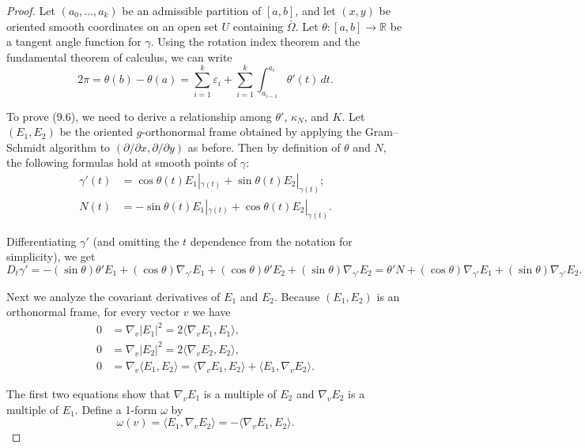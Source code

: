 \begin{proof}
Let $(a_0, \ldots, a_k)$ be an admissible partition of $[a,b]$, and let $(x, y)$ be oriented
smooth coordinates on an open set $U$ containing $\bar{\Omega}$. Let $\theta : [a, b] \to \mathbb{R}$ be a tangent
angle function for $\gamma$. Using the rotation index theorem and the fundamental theorem
of calculus, we can write
\begin{equation}
2\pi = \theta(b) - \theta(a) = \sum_{i=1}^k \varepsilon_i + \sum_{i=1}^k \int_{a_{i-1}}^{a_i} \theta'(t)\,dt. \tag{9.7}
\end{equation}

To prove (9.6), we need to derive a relationship among $\theta'$, $\kappa_N$, and $K$.
Let $(E_1, E_2)$ be the oriented $g$-orthonormal frame obtained by applying the
Gram--Schmidt algorithm to $(\partial/\partial x, \partial/\partial y)$ as before. Then by definition of $\theta$ and
$N$, the following formulas hold at smooth points of $\gamma$:
\begin{align*}
\gamma'(t) &= \cos\theta(t) E_1|_{\gamma(t)} + \sin\theta(t) E_2|_{\gamma(t)};\\
N(t) &= -\sin\theta(t) E_1|_{\gamma(t)} + \cos\theta(t) E_2|_{\gamma(t)}.
\end{align*}

Differentiating $\gamma'$ (and omitting the $t$ dependence from the notation for simplicity),
we get
\begin{equation}
D_t\gamma' = -(\sin\theta)\theta' E_1 + (\cos\theta)\nabla_{\gamma'} E_1 + (\cos\theta)\theta' E_2 + (\sin\theta)\nabla_{\gamma'} E_2
= \theta' N + (\cos\theta)\nabla_{\gamma'} E_1 + (\sin\theta)\nabla_{\gamma'} E_2.
\tag{9.8}
\end{equation}

Next we analyze the covariant derivatives of $E_1$ and $E_2$. Because $(E_1, E_2)$ is an
orthonormal frame, for every vector $v$ we have
\begin{align*}
0 &= \nabla_v|E_1|^2 = 2\langle \nabla_v E_1, E_1 \rangle,\\
0 &= \nabla_v|E_2|^2 = 2\langle \nabla_v E_2, E_2 \rangle,\\
0 &= \nabla_v\langle E_1, E_2 \rangle = \langle \nabla_v E_1, E_2 \rangle + \langle E_1, \nabla_v E_2 \rangle.
\end{align*}

The first two equations show that $\nabla_v E_1$ is a multiple of $E_2$ and $\nabla_v E_2$ is a multiple
of $E_1$. Define a 1-form $\omega$ by
\[
\omega(v) = \langle E_1, \nabla_v E_2 \rangle = -\langle \nabla_v E_1, E_2 \rangle.
\]


\end{proof}

